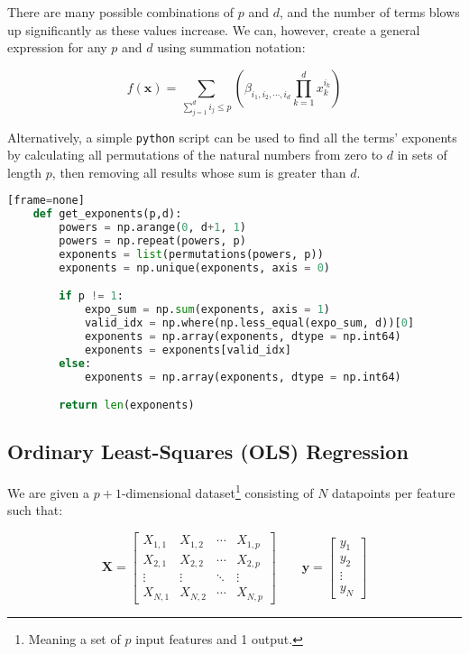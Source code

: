 \documentclass[a4paper,10pt,english]{article}
\begin{document}
	There are many possible combinations of $p$ and $d$, and the number of terms blows up significantly as these values increase.  We can, however, create a general expression \cite{2482654} for any $p$ and $d$ using summation notation:
	
	\begin{equation}
	\label{eq_method_0}
	f(\mathbf{x}) = \sum_{\sum_{j = 1}^d i_j \leq p} \left( \beta_{i_1, i_2, \cdots, i_d} \prod_{k = 1}^d x_k^{i_k} \right)
	\end{equation}
	
	Alternatively, a simple \texttt{python} script can be used to find all the terms' exponents by calculating all permutations of the natural numbers from zero to $d$ in sets of length $p$, then removing all results whose sum is greater than $d$.
	
	\begin{lstlisting}[showstringspaces=false,language=Python,firstnumber = 1][frame=none]
	def get_exponents(p,d):
    	powers = np.arange(0, d+1, 1)
    	powers = np.repeat(powers, p)
    	exponents = list(permutations(powers, p))
    	exponents = np.unique(exponents, axis = 0)

   	 	if p != 1:
        	expo_sum = np.sum(exponents, axis = 1)
        	valid_idx = np.where(np.less_equal(expo_sum, d))[0]
        	exponents = np.array(exponents, dtype = np.int64)
        	exponents = exponents[valid_idx]
    	else:
        	exponents = np.array(exponents, dtype = np.int64)

    	return len(exponents)
	\end{lstlisting}

	\subsection*{Ordinary Least-Squares (OLS) Regression}
	
	We are given a $p+1$-dimensional dataset\footnote{Meaning a set of $p$ input features and 1 output.} consisting of $N$ datapoints per feature such that:
	
	\begin{equation}
	\label{eq_method_1}
	\mathbf{X} = \begin{bmatrix} X_{1,1} & X_{1,2} & \cdots & X_{1,p} \\ X_{2,1} & X_{2,2} & \cdots & X_{2,p} \\ \vdots & \vdots & \ddots & \vdots \\ X_{N,1} & X_{N,2} & \cdots & X_{N,p} \end{bmatrix} \qquad \mathbf{y} = \begin{bmatrix} y_1 \\ y_2 \\ \vdots \\ y_N \end{bmatrix}
	\end{equation}
	
\end{document}
